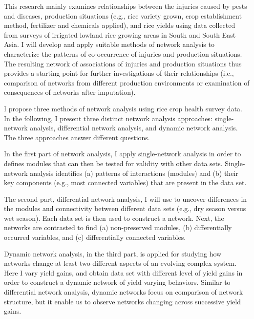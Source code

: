 
This research mainly examines relationships between the injuries caused by pests and diseases, production situations (e.g., rice variety grown, crop establishment method, fertilizer and chemicals applied), and rice yields using data collected from surveys of irrigated lowland rice growing areas in South and South East Asia. I will develop and apply suitable methods of network analysis to characterize the patterns of co-occurrence of injuries and production situations. The resulting network of associations of injuries and production situations thus provides a starting point for further investigations of their relationships (i.e., comparison of networks from different production environments or examination of consequences of networks after imputation). 

I propose three methods of network analysis using rice crop health survey data. In the following, I present three distinct network analysis approaches: single-network analysis, differential network analysis, and dynamic network analysis. The three approaches answer different questions. 

In the first part of network analysis, I apply single-network analysis in order to defines modules that can then be tested for validity with other data sets. Single-network analysis identifies (a) patterns of interactions (modules) and (b) their key components (e.g., most connected variables) that are present in the data set.

The second part, differential network analysis, I will use to uncover differences in the modules and connectivity between different data sets (e.g., dry season versus wet season). Each data set is then used to construct a network. Next, the networks are contrasted to find (a) non-preserved modules, (b) differentially occurred variables, and (c) differentially connected variables. 


Dynamic network analysis, in the third part, is applied for studying how networks change at least two different aspects of an evolving complex system. Here I vary yield gains, and obtain data set with different level of yield gains in order to construct a dynamic network of yield varying behaviors. Similar to differential network analysis, dynamic networks focus on comparison of network structure, but it enable us to observe networks changing across successive yield gains. 


